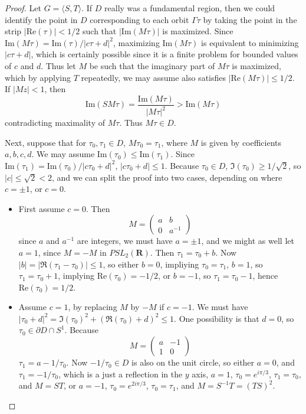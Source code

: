 \begin{proof}
    Let $G = \langle S,T \rangle$. If $D$ really was a fundamental region, then we could identify the point in $D$ corresponding to each orbit $\Gamma \tau$ by taking the point in the strip $|\text{Re}(\tau)| < 1/2$ such that $|\text{Im}(M\tau)|$ is maximized. Since $\text{Im}(M\tau) = \text{Im}(\tau)/|c\tau + d|^2$, maximizing $\text{Im}(M\tau)$ is equivalent to minimizing $|c\tau + d|$, which is certainly possible since it is a finite problem for bounded values of $c$ and $d$. Thus let $M$ be such that the imaginary part of $M\tau$ is maximized, which by applying $T$ repeatedly, we may assume also satisfies $|\text{Re}(M\tau)| \leq 1/2$. If $|Mz| < 1$, then
    \[ \text{Im}(SM\tau) = \frac{\text{Im}(M\tau)}{|M\tau|^2} > \text{Im}(M\tau) \]
    contradicting maximality of $M\tau$. Thus $M\tau \in D$.

    Next, suppose that for $\tau_0, \tau_1 \in D$, $M\tau_0 = \tau_1$, where $M$ is given by coefficients $a,b,c,d$. We may assume $\text{Im}(\tau_0) \leq \text{Im}(\tau_1)$. Since $\text{Im}(\tau_1) = \text{Im}(\tau_0) / |c\tau_0 + d|^2$, $|c\tau_0 + d| \leq 1$. Because $\tau_0 \in D$, $\Im(\tau_0) \geq 1/\sqrt{2}$, so $|c| \leq \sqrt{2} < 2$, and we can split the proof into two cases, depending on where $c = \pm 1$, or $c = 0$.

    \begin{itemize}
        \item First assume $c = 0$. Then
        \[ M = \begin{pmatrix} a & b \\ 0 & a^{-1} \end{pmatrix} \]
        since $a$ and $a^{-1}$ are integers, we must have $a = \pm 1$, and we might as well let $a = 1$, since $M = - M$ in $PSL_2(\mathbf{R})$. Then $\tau_1 = \tau_0 + b$. Now $|b| = |\Re(\tau_1-\tau_0)| \leq 1$, so either $b = 0$, impliying $\tau_0 = \tau_1$, $b = 1$, so $\tau_1 = \tau_0 + 1$, implying $\text{Re}(\tau_0) = -1/2$, or $b = -1$, so $\tau_1 = \tau_0 - 1$, hence $\text{Re}(\tau_0) = 1/2$.

        \item Assume $c = 1$, by replacing $M$ by $-M$ if $c = -1$. We must have $|\tau_0 + d|^2 = \Im(\tau_0)^2 + (\Re(\tau_0) + d)^2 \leq 1$. One possibility is that $d = 0$, so $\tau_0 \in \partial D \cap S^1$. Because
        \[ M = \begin{pmatrix} a & -1 \\ 1 & 0 \end{pmatrix} \]
        $\tau_1 = a - 1/\tau_0$. Now $-1/\tau_0 \in D$ is also on the unit circle, so either $a = 0$, and $\tau_1 = -1/\tau_0$, which is a just a reflection in the $y$ axis, $a = 1$, $\tau_0 = e^{i\pi/3}$, $\tau_1 = \tau_0$, and $M = ST$, or $a = -1$, $\tau_0 = e^{2i\pi/3}$, $\tau_0 = \tau_1$, and $M = S^{-1}T = (TS)^2$.


\end{itemize}
\end{proof}
